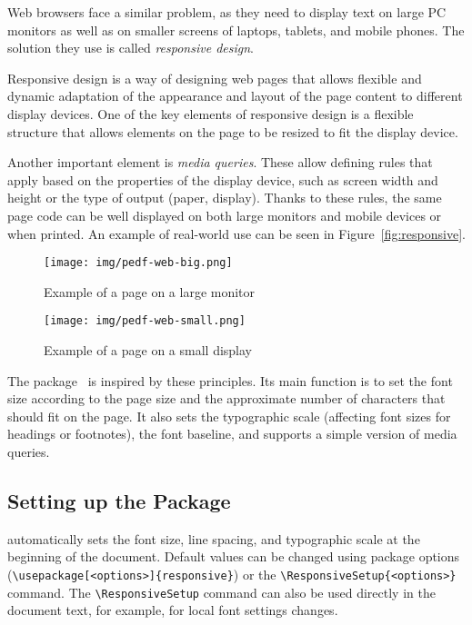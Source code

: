 \documentclass{ltugboat}
\begin{document}
Web browsers face a similar problem, as they need to display text on large PC
monitors as well as on smaller screens of laptops, tablets, and mobile phones.
The solution they use is called \textit{responsive design}.

Responsive design is a way of designing web pages that allows flexible and
dynamic adaptation of the appearance and layout of the page content to
different display devices. One of the key elements of responsive design is a
flexible structure that allows elements on the page to be resized to fit the
display device.

Another important element is \textit{media queries}. These allow defining rules
that apply based on the properties of the display device, such as screen width
and height or the type of output (paper, display). Thanks to these rules, the
same page code can be well displayed on both large monitors and mobile devices
or when printed. An example of real-world use can be seen in
Figure~\ref{fig:responsive}.


\begin{figure*}[tbp]
\begin{subfigure}[t]{0.74\textwidth}
    \texttt{[image: img/pedf-web-big.png]}
    \caption{Example of a page on a large monitor}
\end{subfigure}
\hfill
\begin{subfigure}[t]{0.24\textwidth}
    \texttt{[image: img/pedf-web-small.png]}
    \caption{Example of a page on a small display}
\end{subfigure}
  \caption{Example of displaying a web page using responsive
  design}\label{fig:responsive}
\end{figure*}

The  package~\cite{responsive} is inspired by these
principles. Its main function is to set the font size according to the page
size and the approximate number of characters that should fit on the page. It
also sets the typographic scale (affecting font sizes for headings or
footnotes), the font baseline, and supports a simple version of media queries.

\subsection{Setting up the  Package}

 automatically sets the font size, line spacing, and
typographic scale at the beginning of the document. Default values can be
changed using package options (\verb|\usepackage[<options>]{responsive}|) or
the \verb|\ResponsiveSetup{<options>}| command. The \verb|\ResponsiveSetup|
command can also be used directly in the document text, for example, for local
font settings changes.
\end{document}
